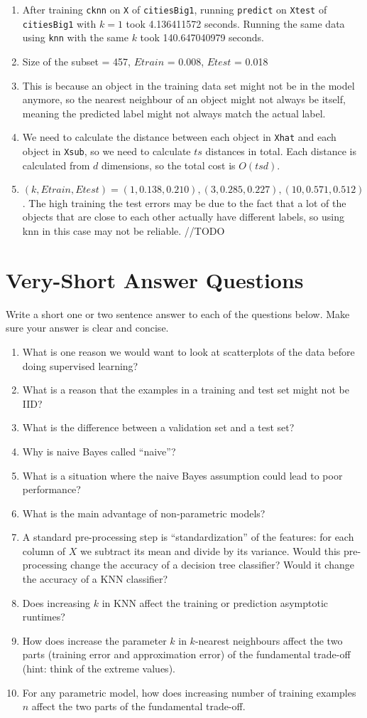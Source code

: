 \documentclass{article}
\def\blu#1{{\color{blu}#1}}
\def\enum#1{\begin{enumerate}#1\end{enumerate}}
\begin{document}
\enum{
	\item After training \texttt{cknn} on \texttt{X} of \texttt{citiesBig1}, running \texttt{predict} on \texttt{Xtest} of \texttt{citiesBig1} with $k = 1$ took 4.136411572 seconds. Running the same data using \texttt{knn} with the same $k$ took 140.647040979 seconds.
	\item Size of the subset = 457, $Etrain$ = 0.008, $Etest$ = 0.018
	\item This is because an object in the training data set might not be in the model anymore, so the nearest neighbour of an object might not always be itself, meaning the predicted label might not always match the actual label.
	\item We need to calculate the distance between each object in \texttt{Xhat} and each object in \texttt{Xsub}, so we need to calculate $ts$ distances in total. Each distance is calculated from $d$ dimensions, so the total cost is $O(tsd)$.
    \item $(k, Etrain, Etest) = (1, 0.138, 0.210), (3, 0.285, 0.227), (10, 0.571, 0.512)$. The high training the test errors may be due to the fact that a lot of the objects that are close to each other actually have different labels, so using knn in this case may not be reliable. //TODO
}

\section{Very-Short Answer Questions}

\blu{Write a short one or two sentence answer to each of the questions below}. Make sure your answer is clear and concise.

\enum{
\item What is one reason we would want to look at scatterplots of the data before doing supervised learning?
\item What is a reason that the examples in a training and test set might not be IID?
\item What is the difference between a validation set and a test set?
\item Why is  naive Bayes called ``naive''?
\item What is a situation where the naive Bayes assumption could lead to poor performance?
\item What is the main advantage of non-parametric models?
\item A standard pre-processing step is ``standardization'' of the features: for each column of $X$ we subtract its mean and divide by its variance. Would this pre-processing change the accuracy of a decision tree classifier? Would it change the accuracy of a KNN classifier?
\item Does increasing $k$ in KNN affect the training or prediction asymptotic runtimes?
\item How does increase the parameter $k$ in $k$-nearest neighbours affect the two parts (training error and approximation error) of the fundamental trade-off (hint: think of the extreme values).
\item For any parametric model, how does increasing number of training examples $n$ affect the two parts of the fundamental trade-off.
}
\end{document}
